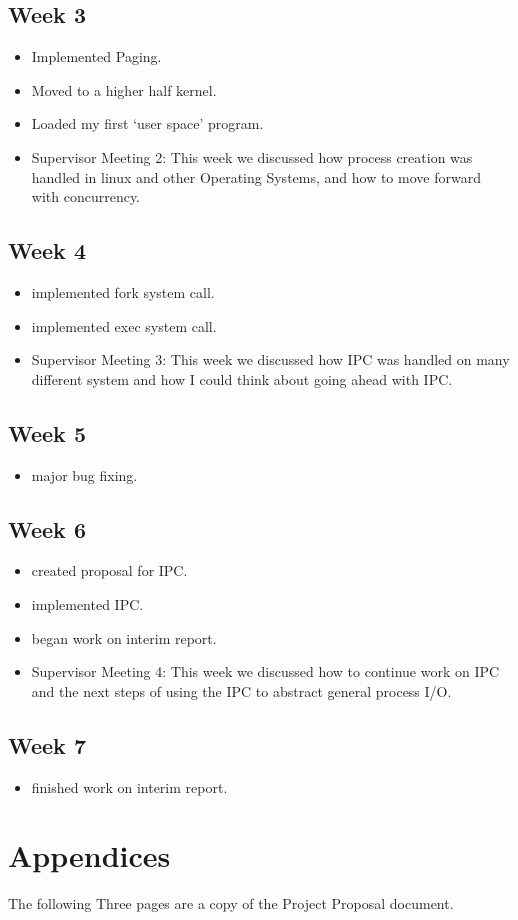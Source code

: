 \documentclass[a4paper]{report}
\begin{document}
\section{Week 3}
\begin{itemize}
\item Implemented Paging.
\item Moved to a higher half kernel.
\item Loaded my first `user space' program.
\item Supervisor Meeting 2: This week we discussed how process creation was handled in linux and other Operating Systems, and how to move forward with concurrency.
\end{itemize}

\section{Week 4}
\begin{itemize}
\item implemented fork system call.
\item implemented exec system call.
\item Supervisor Meeting 3: This week we discussed how IPC was handled on many different system and how I could think about going ahead with IPC.
\end{itemize}

\section{Week 5}
\begin{itemize}
\item major bug fixing.
\end{itemize}

\section{Week 6}
\begin{itemize}
\item created proposal for IPC.
\item implemented IPC.
\item began work on interim report.
\item Supervisor Meeting 4: This week we discussed how to continue work on IPC and the next steps of using the IPC to abstract general process I/O.
\end{itemize}

\section{Week 7}
\begin{itemize}
\item finished work on interim report.
\end{itemize}

\chapter{Appendices}

The following Three pages are a copy of the Project Proposal document.








\end{document}
